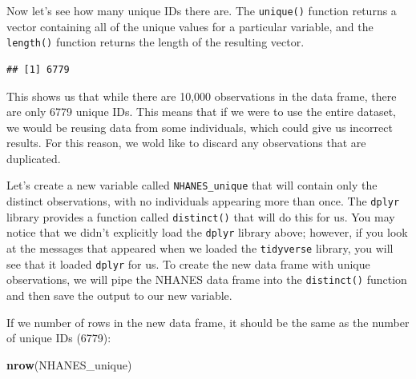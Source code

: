 \documentclass[12pt,]{book}
\newenvironment{Shaded}{\begin{snugshade}}{\end{snugshade}}
\newcommand{\DataTypeTok}[1]{\textcolor[rgb]{0.13,0.29,0.53}{#1}}
\newcommand{\KeywordTok}[1]{\textcolor[rgb]{0.13,0.29,0.53}{\textbf{#1}}}
\newcommand{\NormalTok}[1]{#1}
\newcommand{\OperatorTok}[1]{\textcolor[rgb]{0.81,0.36,0.00}{\textbf{#1}}}
\newcommand{\OtherTok}[1]{\textcolor[rgb]{0.56,0.35,0.01}{#1}}
\newcommand{\StringTok}[1]{\textcolor[rgb]{0.31,0.60,0.02}{#1}}
\begin{document}
Now let's see how many unique IDs there are. The \texttt{unique()} function returns a vector containing all of the unique values for a particular variable, and the \texttt{length()} function returns the length of the resulting vector.

\begin{Shaded}
\end{Shaded}

\begin{verbatim}
## [1] 6779
\end{verbatim}

This shows us that while there are 10,000 observations in the data frame, there are only 6779 unique IDs. This means that if we were to use the entire dataset, we would be reusing data from some individuals, which could give us incorrect results. For this reason, we wold like to discard any observations that are duplicated.

Let's create a new variable called \texttt{NHANES\_unique} that will contain only the distinct observations, with no individuals appearing more than once. The \texttt{dplyr} library provides a function called \texttt{distinct()} that will do this for us. You may notice that we didn't explicitly load the \texttt{dplyr} library above; however, if you look at the messages that appeared when we loaded the \texttt{tidyverse} library, you will see that it loaded \texttt{dplyr} for us. To create the new data frame with unique observations, we will pipe the NHANES data frame into the \texttt{distinct()} function and then save the output to our new variable.

\begin{Shaded}
\end{Shaded}

If we number of rows in the new data frame, it should be the same as the number of unique IDs (6779):

\begin{Shaded}
\begin{Highlighting}[]
\KeywordTok{nrow}\NormalTok{(NHANES_unique)}
\end{Highlighting}
\end{Shaded}
\end{document}
